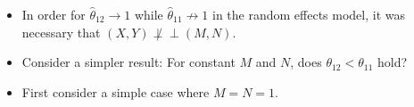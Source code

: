 \documentclass{beamer}
\renewcommand{\P}{P}
\newcommand{\cind}{\perp \!\!\! \perp}
\newcommand{\aucindiv}{\theta_{11}}%
\newcommand{\aucpop}{\theta_{12}}%
\newcommand{\aucindivhat}{\hat{\theta}_{11}}%
\newcommand{\aucpophat}{\hat{\theta}_{12}}%
\newcommand{\B}{B}
\begin{document}
\begin{frame}
  \begin{itemize}
  \item In order for $\aucpophat\to 1$ while $\aucindivhat\not\to 1$ in the
  random effects model, it
  was necessary that $(X,Y)\not\cind (M,N)$.

\item Consider a simpler result: For constant $M$ and $N$, does $\aucpop<\aucindiv$ hold?
  
\item First consider a simple case where $M=N=1.$

\end{itemize}

\end{frame}

\end{document}
